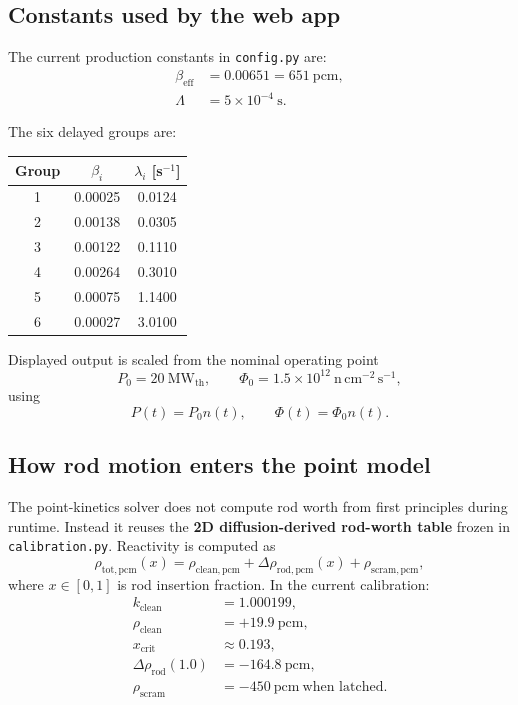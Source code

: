 \documentclass[11pt]{article}
\begin{document}
\subsection{Constants used by the web app}

The current production constants in \texttt{config.py} are:
\begin{align*}
\beta_{\mathrm{eff}} &= 0.00651 = 651\ \mathrm{pcm}, \\
\Lambda &= 5\times 10^{-4}\ \mathrm{s}.
\end{align*}

The six delayed groups are:

\begin{center}
\begin{tabular}{ccc}
\toprule
Group & $\beta_i$ & $\lambda_i$ [s$^{-1}$] \\
\midrule
1 & 0.00025 & 0.0124 \\
2 & 0.00138 & 0.0305 \\
3 & 0.00122 & 0.1110 \\
4 & 0.00264 & 0.3010 \\
5 & 0.00075 & 1.1400 \\
6 & 0.00027 & 3.0100 \\
\bottomrule
\end{tabular}
\end{center}

Displayed output is scaled from the nominal operating point
\[
P_0 = 20\ \mathrm{MW_{th}}, \qquad
\Phi_0 = 1.5\times 10^{12}\ \mathrm{n\,cm^{-2}\,s^{-1}},
\]
using
\[
P(t) = P_0 n(t), \qquad \Phi(t) = \Phi_0 n(t).
\]

\subsection{How rod motion enters the point model}

The point-kinetics solver does not compute rod worth from first principles during
runtime.  Instead it reuses the \textbf{2D diffusion-derived rod-worth table}
frozen in \texttt{calibration.py}.  Reactivity is computed as
\[
\rho_{\mathrm{tot,pcm}}(x)
= \rho_{\mathrm{clean,pcm}} + \Delta \rho_{\mathrm{rod,pcm}}(x)
+ \rho_{\mathrm{scram,pcm}},
\]
where $x \in [0,1]$ is rod insertion fraction.  In the current calibration:
\begin{align*}
k_{\mathrm{clean}} &= 1.000199, \\
\rho_{\mathrm{clean}} &= +19.9\ \mathrm{pcm}, \\
x_{\mathrm{crit}} &\approx 0.193, \\
\Delta \rho_{\mathrm{rod}}(1.0) &= -164.8\ \mathrm{pcm}, \\
\rho_{\mathrm{scram}} &= -450\ \mathrm{pcm}\ \text{when latched.}
\end{align*}
\end{document}
